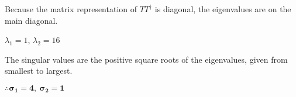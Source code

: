 \documentclass[fleqn]{article}
\begin{document}
\begin{enumerate}[nolistsep]
		Because the matrix representation of $TT^{\dag}$ is diagonal, the eigenvalues are on the main diagonal.
		
		$\lambda_1 = 1$, $\lambda_2 = 16$
		
		The singular values are the positive square roots of the eigenvalues, given from smallest to largest.
		
		$\mathbf{\therefore \sigma_1 = 4,\ \sigma_2 = 1}$
	\end{enumerate}
\end{document}
